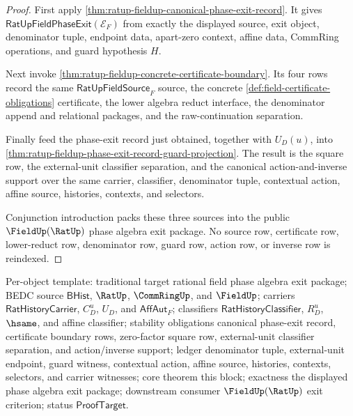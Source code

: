 \begin{proof}
First apply
\autoref{thm:ratup-fieldup-canonical-phase-exit-record}. It gives
$\mathsf{RatUpFieldPhaseExit}(\mathcal E_F)$ from exactly the displayed source,
exit object, denominator tuple, endpoint data, apart-zero context, affine data,
CommRing operations, and guard hypothesis $H$.

Next invoke \autoref{thm:ratup-fieldup-concrete-certificate-boundary}. Its four
rows record the same $\mathsf{RatUpFieldSource}_F$ source, the concrete
\autoref{def:field-certificate-obligations} certificate, the lower algebra
reduct interface, the denominator append and relational packages, and the
raw-continuation separation.

Finally feed the phase-exit record just obtained, together with $U_D(u)$, into
\autoref{thm:ratup-fieldup-phase-exit-record-guard-projection}. The result is
the square row, the external-unit classifier separation, and the canonical
action-and-inverse support over the same carrier, classifier, denominator tuple,
contextual action, affine source, histories, contexts, and selectors.

Conjunction introduction packs these three sources into the public
$\FieldUp(\RatUp)$ phase algebra exit package. No source row, certificate row,
lower-reduct row, denominator row, guard row, action row, or inverse row is
reindexed.
\end{proof}

Per-object template: traditional target rational field phase algebra exit
package; BEDC source $\mathsf{BHist}$, $\RatUp$, $\CommRingUp$, and
$\FieldUp$; carriers $\mathsf{RatHistoryCarrier}$, $C_D^u$, $U_D$, and
$\mathsf{AffAut}_F$; classifiers $\mathsf{RatHistoryClassifier}$, $R_D^u$,
$\hsame$, and affine classifier; stability obligations canonical phase-exit
record, certificate boundary rows, zero-factor square row, external-unit
classifier separation, and action/inverse support; ledger denominator tuple,
external-unit endpoint, guard witness, contextual action, affine source,
histories, contexts, selectors, and carrier witnesses; core theorem this block;
exactness the displayed phase algebra exit package; downstream consumer
$\FieldUp(\RatUp)$ exit criterion; status $\mathsf{ProofTarget}$.

